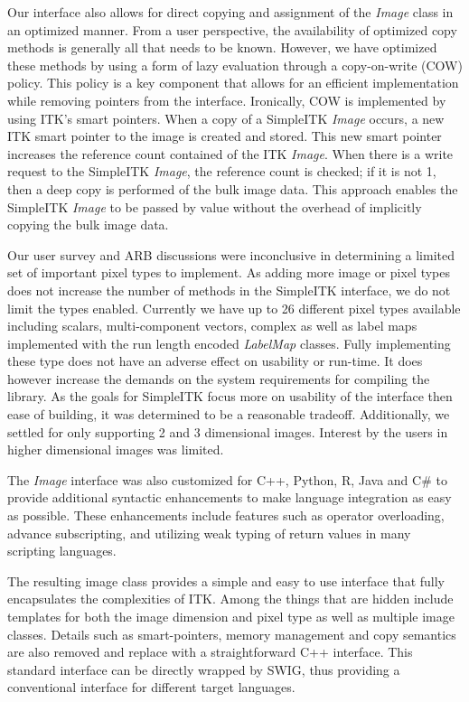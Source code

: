 \documentclass{frontiersMED} %
\begin{document}
Our interface also allows for direct copying and assignment of the
\textit{Image} class in an optimized manner. From a user perspective, the
availability of optimized copy methods is generally all that needs to
be known. However, we have optimized these methods by using a form of
lazy evaluation through a copy-on-write (COW)  policy. This policy is
a key component that allows for an efficient implementation while
removing pointers from the interface. Ironically, COW is implemented
by using ITK's smart pointers. When a copy of a SimpleITK \textit{Image}
occurs, a new ITK smart pointer to the image is created and
stored. This new smart pointer increases the reference count contained
of the ITK \textit{Image}. When there is a write request to the SimpleITK
\textit{Image}, the reference count is checked; if it is not 1, then a deep
copy is performed of the bulk image data. This approach enables the
SimpleITK \textit{Image} to be passed by value without the overhead of
implicitly copying the bulk image data.

Our user survey and ARB discussions were inconclusive in determining a
limited set of important pixel types to implement. As adding more
image or pixel types does not increase the number of methods in the
SimpleITK interface, we do not limit the types enabled. Currently we
have up to 26 different pixel types available including scalars,
multi-component vectors, complex as well as label maps implemented
with the run length encoded \textit{LabelMap} classes. Fully implementing these
type does not have an adverse effect on usability or run-time. It does
however increase the demands on the system requirements for compiling
the library. As the goals for SimpleITK focus more on usability of the
interface then ease of building, it was determined to be a reasonable
tradeoff. Additionally, we settled for only supporting 2 and 3
dimensional images. Interest by the users in higher dimensional images
was limited.

The \textit{Image} interface was also customized for C++, Python, R, Java and C\# to
provide additional syntactic enhancements to make language integration
as easy as possible. These enhancements include features such as
operator overloading, advance subscripting, and utilizing weak typing
of return values in many scripting languages.

The resulting image class provides a simple and easy to use interface
that fully encapsulates the complexities of ITK. Among the things that
are hidden include templates for both the image dimension and pixel
type as well as multiple image classes. Details such as
smart-pointers, memory management and copy semantics are also removed
and replace with a straightforward C++ interface. This standard
interface can be directly wrapped by SWIG, thus providing a
conventional interface for different target languages.
\end{document}
